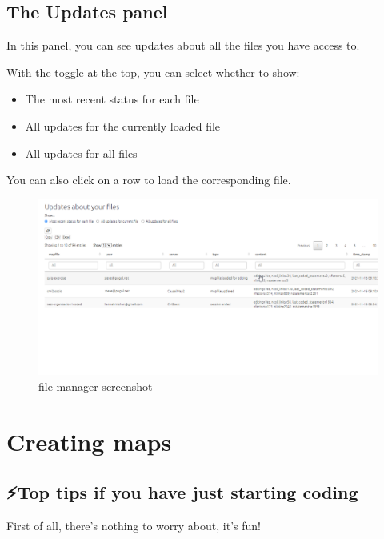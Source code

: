 \documentclass[
]{book}
\providecommand{\tightlist}{%
  \setlength{\itemsep}{0pt}\setlength{\parskip}{0pt}}
\begin{document}
\hypertarget{the-updates-panel}{%
\chapter{The Updates panel}\label{the-updates-panel}}

In this panel, you can see updates about all the files you have access to.

With the toggle at the top, you can select whether to show:

\begin{itemize}
\tightlist
\item
  The most recent status for each file
\item
  All updates for the currently loaded file
\item
  All updates for all files
\end{itemize}

You can also click on a row to load the corresponding file.

\begin{figure}
\centering
\includegraphics[width=6.77083in,height=\textheight]{_assets/file manager screenshot-16376049547992.png}
\caption{file manager screenshot}
\end{figure}

\hypertarget{part-creating-maps}{%
\part{Creating maps}\label{part-creating-maps}}

\hypertarget{top-tips}{%
\chapter{⚡Top tips if you have just starting coding}\label{top-tips}}

First of all, there's nothing to worry about, it's fun!
\end{document}

